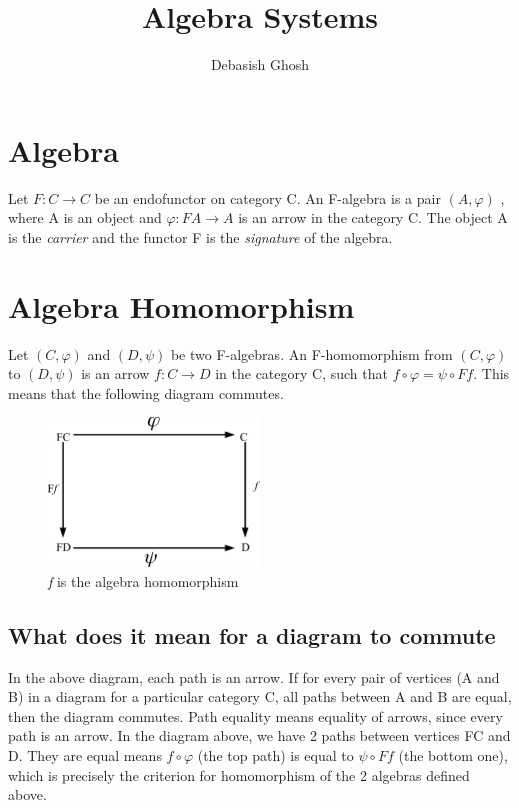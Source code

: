\documentclass{article}
\begin{document}
\title{Algebra Systems}
\author{Debasish Ghosh}

\section{Algebra}
\label{algebra}

Let $ F: C \rightarrow C $ be an endofunctor on category C. An F-algebra is a pair $ (A, \varphi) $ , where A is an object and $ \varphi : FA \rightarrow A $ is an arrow in the category C. The object A is the \textit{carrier} and the functor F is the \textit{signature} of the algebra.

\section{Algebra Homomorphism}
\label{algebrahomomorphism}

Let $(C, \varphi)$ and $(D, \psi)$ be two F-algebras. An F-homomorphism from $(C, \varphi)$ to $(D, \psi)$ is an arrow $f : C \rightarrow D$ in the category C, such that $f \circ \varphi = \psi \circ Ff$. This means that the following diagram commutes. 

\begin{figure}[htb]
\begin{center}
\includegraphics[width=0.5\textwidth]{figures/alg1}
\caption{\textit{f} is the algebra homomorphism}
\end{center}
\end{figure}

\subsection{What does it mean for a diagram to commute}

In the above diagram, each path is an arrow. If for every pair of vertices (A and B) in a diagram for a particular category C, all paths between A and B are equal, then the diagram commutes. Path equality means equality of arrows, since every path is an arrow. In the diagram above, we have 2 paths between vertices FC and D. They are equal means $f \circ \varphi$ (the top path) is equal to $\psi \circ Ff$ (the bottom one), which is precisely the criterion for homomorphism of the 2 algebras defined above.
\end{document}
